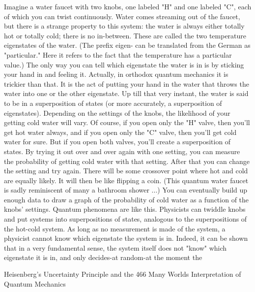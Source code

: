         Imagine a water faucet with two knobs, one labeled "H" and one labeled "C",
each of which you can twist continuously. Water comes streaming out of the faucet,
but there is a strange property to this system: the water is always either totally hot or
totally cold; there is no in-between. These are called the two temperature eigenstates
of the water. (The prefix eigen- can be translated from the German as "particular."
Here it refers to the fact that the temperature has a particular value.) The only way
you can tell which eigenstate the water is in is by sticking your hand in and feeling it.
Actually, in orthodox quantum mechanics it is trickier than that. It is the act of putting
your hand in the water that throws the water into one or the other eigenstate. Up till
that very instant, the water is said to be in a superposition of states (or more
accurately, a superposition of eigenstates).
        Depending on the settings of the knobs, the likelihood of your getting cold
water will vary. Of course, if you open only the "H" valve, then you'll get hot water
always, and if you open only the "C" valve, then you'll get cold water for sure. But if
you open both valves, you'll create a superposition of states. By trying it out over and
over again with one setting, you can measure the probability of getting cold water
with that setting. After that you can change the setting and try again. There will be
some crossover point where hot and cold are equally likely. It will then be like
flipping a coin. (This quantum water faucet is sadly reminiscent of many a bathroom
shower ...) You can eventually build up enough data to draw a graph of the probability
of cold water as a function of the knobs' settings.
        Quantum phenomena are like this. Physicists can twiddle knobs and put
systems into superpositions of states, analogous to the superpositions of the hot-cold
system. As long as no measurement is made of the system, a physicist cannot know
which eigenstate the system is in. Indeed, it can be shown that in a very fundamental
sense, the system itself does not "know" which eigenstate it is in, and only decides-at
random-at the moment the




Heisenberg's Uncertainty Principle and the                                            466
Many Worlds Interpretation of Quantum Mechanics


